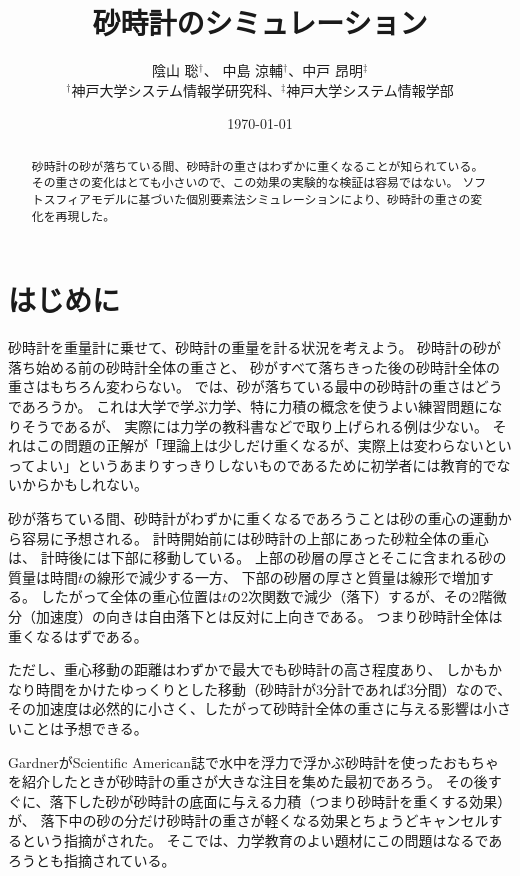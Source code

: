 \documentclass[dvipdfmx]{article}
\title{砂時計のシミュレーション}
\author{陰山 聡$^\dagger$、 中島 涼輔$^\dagger$、中戸 昂明$^\ddagger$ \\[0.5em] 
        $^\dagger$神戸大学システム情報学研究科、$^\ddagger$神戸大学システム情報学部 }
\date{\today}
\begin{document}
\maketitle


\begin{abstract}
砂時計の砂が落ちている間、砂時計の重さはわずかに重くなることが知られている。
その重さの変化はとても小さいので、この効果の実験的な検証は容易ではない。
ソフトスフィアモデルに基づいた個別要素法シミュレーションにより、砂時計の重さの変化を再現した。
\end{abstract}


\section{はじめに}
砂時計を重量計に乗せて、砂時計の重量を計る状況を考えよう。
砂時計の砂が落ち始める前の砂時計全体の重さと、
砂がすべて落ちきった後の砂時計全体の重さはもちろん変わらない。
では、砂が落ちている最中の砂時計の重さはどうであろうか。
これは大学で学ぶ力学、特に力積の概念を使うよい練習問題になりそうであるが、
実際には力学の教科書などで取り上げられる例は少ない。
それはこの問題の正解が「理論上は少しだけ重くなるが、実際上は変わらないといってよい」というあまりすっきりしないものであるために初学者には教育的でないからかもしれない。


砂が落ちている間、砂時計がわずかに重くなるであろうことは砂の重心の運動から容易に予想される。
計時開始前には砂時計の上部にあった砂粒全体の重心は、
計時後には下部に移動している。
上部の砂層の厚さとそこに含まれる砂の質量は時間$t$の線形で減少する一方、
下部の砂層の厚さと質量は線形で増加する。
したがって全体の重心位置は$t$の2次関数で減少（落下）するが、その2階微分（加速度）の向きは自由落下とは反対に上向きである。
つまり砂時計全体は重くなるはずである。


ただし、重心移動の距離はわずかで最大でも砂時計の高さ程度あり、
しかもかなり時間をかけたゆっくりとした移動（砂時計が3分計であれば3分間）なので、
その加速度は必然的に小さく、したがって砂時計全体の重さに与える影響は小さいことは予想できる。


GardnerがScientific American誌で水中を浮力で浮かぶ砂時計を使ったおもちゃを紹介したときが砂時計の重さが大きな注目を集めた最初であろう\cite{Gardner1966-eu}。
その後すぐに、落下した砂が砂時計の底面に与える力積（つまり砂時計を重くする効果）が、
落下中の砂の分だけ砂時計の重さが軽くなる効果とちょうどキャンセルするという指摘がされた\cite{Reid1967-jq}。
そこでは、力学教育のよい題材にこの問題はなるであろうとも指摘されている。
\end{document}
